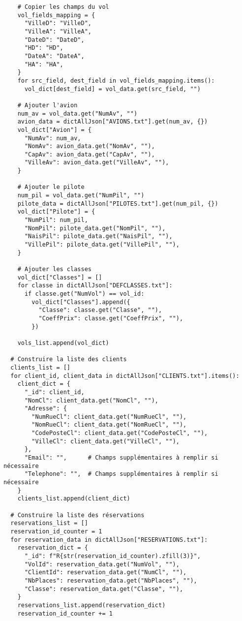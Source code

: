 \begin{verbatim}
    # Copier les champs du vol
    vol_fields_mapping = {
      "VilleD": "VilleD",
      "VilleA": "VilleA",
      "DateD": "DateD",
      "HD": "HD",
      "DateA": "DateA",
      "HA": "HA",
    }
    for src_field, dest_field in vol_fields_mapping.items():
      vol_dict[dest_field] = vol_data.get(src_field, "")
  
    # Ajouter l'avion
    num_av = vol_data.get("NumAv", "")
    avion_data = dictAllJson["AVIONS.txt"].get(num_av, {})
    vol_dict["Avion"] = {
      "NumAv": num_av,
      "NomAv": avion_data.get("NomAv", ""),
      "CapAv": avion_data.get("CapAv", ""),
      "VilleAv": avion_data.get("VilleAv", ""),
    }
  
    # Ajouter le pilote
    num_pil = vol_data.get("NumPil", "")
    pilote_data = dictAllJson["PILOTES.txt"].get(num_pil, {})
    vol_dict["Pilote"] = {
      "NumPil": num_pil,
      "NomPil": pilote_data.get("NomPil", ""),
      "NaisPil": pilote_data.get("NaisPil", ""),
      "VillePil": pilote_data.get("VillePil", ""),
    }
  
    # Ajouter les classes
    vol_dict["Classes"] = []
    for classe in dictAllJson["DEFCLASSES.txt"]:
      if classe.get("NumVol") == vol_id:
        vol_dict["Classes"].append({
          "Classe": classe.get("Classe", ""),
          "CoeffPrix": classe.get("CoeffPrix", ""),
        })
  
    vols_list.append(vol_dict)
  
  # Construire la liste des clients
  clients_list = []
  for client_id, client_data in dictAllJson["CLIENTS.txt"].items():
    client_dict = {
      "_id": client_id,
      "NomCl": client_data.get("NomCl", ""),
      "Adresse": {
        "NumRueCl": client_data.get("NumRueCl", ""),
        "NomRueCl": client_data.get("NomRueCl", ""),
        "CodePosteCl": client_data.get("CodePosteCl", ""),
        "VilleCl": client_data.get("VilleCl", ""),
      },
      "Email": "",      # Champs supplémentaires à remplir si nécessaire
      "Telephone": "",  # Champs supplémentaires à remplir si nécessaire
    }
    clients_list.append(client_dict)
  
  # Construire la liste des réservations
  reservations_list = []
  reservation_id_counter = 1
  for reservation_data in dictAllJson["RESERVATIONS.txt"]:
    reservation_dict = {
      "_id": f"R{str(reservation_id_counter).zfill(3)}",
      "VolId": reservation_data.get("NumVol", ""),
      "ClientId": reservation_data.get("NumCl", ""),
      "NbPlaces": reservation_data.get("NbPlaces", ""),
      "Classe": reservation_data.get("Classe", ""),
    }
    reservations_list.append(reservation_dict)
    reservation_id_counter += 1
  

\end{verbatim}
